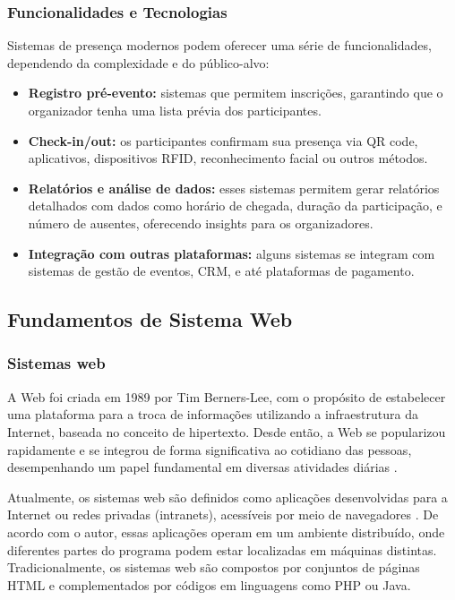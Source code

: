 \subsubsection{Funcionalidades e Tecnologias}
Sistemas de presença modernos podem oferecer uma série de funcionalidades, dependendo da complexidade e do público-alvo:

\begin{itemize}
    \item \textbf{Registro pré-evento:} sistemas que permitem inscrições, garantindo que o organizador tenha uma lista prévia dos participantes.
    \item \textbf{Check-in/out:} os participantes confirmam sua presença via QR code, aplicativos, dispositivos RFID, reconhecimento facial ou outros métodos.
    \item \textbf{Relatórios e análise de dados:} esses sistemas permitem gerar relatórios detalhados com dados como horário de chegada, duração da participação, e número de ausentes, oferecendo insights para os organizadores.
    \item \textbf{Integração com outras plataformas:} alguns sistemas se integram com sistemas de gestão de eventos, CRM, e até plataformas de pagamento.
\end{itemize}

\subsection{Fundamentos de Sistema Web}

\subsubsection{Sistemas web}
A Web foi criada em 1989 por Tim Berners-Lee, com o propósito de estabelecer uma plataforma para a troca de informações utilizando a infraestrutura da Internet, baseada no conceito de hipertexto. Desde então, a Web se popularizou rapidamente e se integrou de forma significativa ao cotidiano das pessoas, desempenhando um papel fundamental em diversas atividades diárias \cite{vechiato2019}.

Atualmente, os sistemas web são definidos como aplicações desenvolvidas para a Internet ou redes privadas (intranets), acessíveis por meio de navegadores \cite{ferreira2023}. De acordo com o autor, essas aplicações operam em um ambiente distribuído, onde diferentes partes do programa podem estar localizadas em máquinas distintas. Tradicionalmente, os sistemas web são compostos por conjuntos de páginas HTML e complementados por códigos em linguagens como PHP ou Java.

